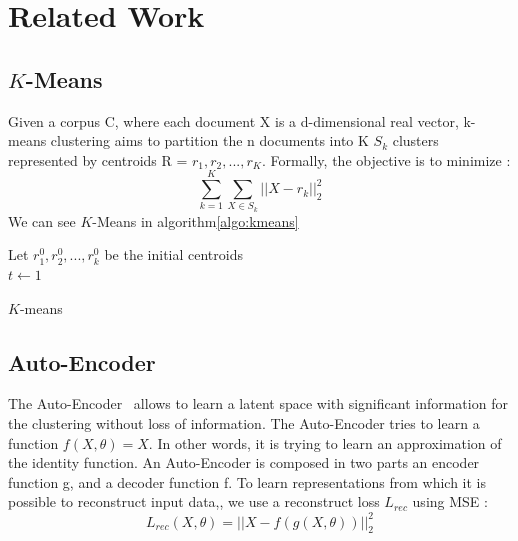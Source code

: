 \section{Related Work}\label{sec:related}
\subsection{$K$-Means}
Given a corpus C, where each document X is a 
d-dimensional real vector, k-means clustering aims to partition the n 
documents into K $S_k$ clusters represented by centroids 
R = {$r_1, r_2, ..., r_K$}.
Formally, the objective is to minimize :
$$
\sum\limits_{k =1 }^K \sum\limits_{X \in S_k} ||X - r_k||_2^2
$$
We can see $K$-Means in algorithm\ref{algo:kmeans}
\begin{algorithm}
  Let $r_1^{0}, r_2^{0} , ..., r_k^{0}$ be the initial centroids\\
  $t \gets 1$\\
  \caption{\label{algo:kmeans}$K$-means}
\end{algorithm}

\subsection{Auto-Encoder}
The Auto-Encoder~\cite{Goodfellow-et-al-2016} allows to learn a latent space with significant
information for the clustering without loss of information.
The Auto-Encoder tries to learn a function $f (X, \theta) = X$. In
other words, it is trying to learn an approximation of the identity
function. An Auto-Encoder is composed in two parts an encoder function
g, and a decoder function f. To learn representations from which it is 
possible to reconstruct input data,, we use a
reconstruct loss $L_{rec}$ using MSE :
\begin{equation}
  L_{rec}(X, \theta) = || X - f(g(X, \theta)) ||_2^2 
\end{equation}

